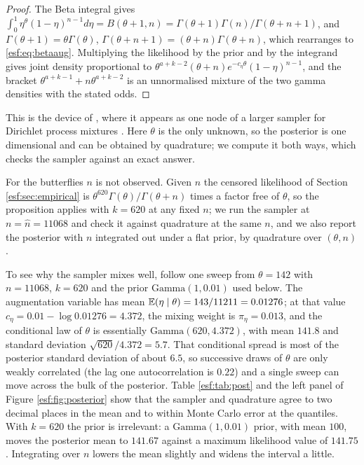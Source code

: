 \begin{proof}
The Beta integral gives
$\int_0^1 \eta^{\theta}(1-\eta)^{n-1} d\eta = B(\theta+1,n)
= \Gamma(\theta+1)\Gamma(n)/\Gamma(\theta+n+1)$, and
$\Gamma(\theta+1) = \theta \Gamma(\theta)$, $\Gamma(\theta+n+1) = (\theta+n)
\Gamma(\theta+n)$, which rearranges to \eqref{esf:eq:betaaug}. Multiplying the likelihood
by the prior and by the integrand gives joint density proportional to
$\theta^{a+k-2} (\theta+n) e^{-c_\eta \theta} (1-\eta)^{n-1}$, and the bracket
$\theta^{a+k-1} + n \theta^{a+k-2}$ is an unnormalised mixture of the two gamma
densities with the stated odds.
\end{proof}

This is the device of \citet{esf:escobar1995}, where it appears as one node of a
larger sampler for Dirichlet process mixtures \citep{esf:antoniak1974}. Here $\theta$ is the only unknown, so
the posterior is one dimensional and can be obtained by quadrature; we compute it both
ways, which checks the sampler against an exact answer.

For the butterflies $n$ is not observed. Given $n$ the censored likelihood of Section \ref{esf:sec:empirical} is $\theta^{620}\Gamma(\theta)/\Gamma(\theta+n)$ times a factor free of $\theta$, so the proposition applies with $k = 620$ at any fixed $n$; we run the sampler at $n = \hat n = 11068$ and check it against quadrature at the same $n$, and we also report the posterior with $n$ integrated out under a flat prior, by quadrature over $(\theta, n)$.

To see why the sampler mixes well, follow one sweep from $\theta = 142$ with
$n = 11068$, $k = 620$ and the prior $\mathrm{Gamma}(1, 0.01)$ used below. The
augmentation variable has mean $\mathbb{E}(\eta \mid \theta) = 143/11211 = 0.01276$; at that
value $c_\eta = 0.01 - \log 0.01276 = 4.372$, the mixing weight is
$\pi_\eta = 0.013$, and the conditional law of $\theta$ is essentially
$\mathrm{Gamma}(620, 4.372)$, with mean $141.8$ and standard deviation
$\sqrt{620}/4.372 = 5.7$. That conditional spread is most of the posterior standard
deviation of about $6.5$, so successive draws of $\theta$ are only weakly correlated (the lag one autocorrelation is $0.22$)
and a single sweep can move across the bulk of the posterior. Table \ref{esf:tab:post} and the
left panel of Figure \ref{esf:fig:posterior} show that the sampler and quadrature agree to two decimal places in
the mean and to within Monte Carlo error at the quantiles. With $k = 620$ the prior is
irrelevant: a $\mathrm{Gamma}(1, 0.01)$ prior, with mean $100$, moves the posterior
mean to $141.67$ against a maximum likelihood value of $141.75$. Integrating over $n$ lowers the mean slightly and widens the interval a little.

